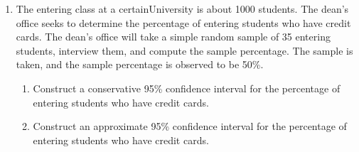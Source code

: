 \documentclass[12pt]{article}%
\newcommand{\0}{{\bf 0}}
\begin{document}
\begin{enumerate}
\item
The entering class at a certainUniversity is about 1000 students. The dean's office seeks to determine the percentage of entering students who have credit cards. The dean's office will take a simple random sample of 35 entering students, interview them, and compute the sample percentage. 
The sample is taken, and the sample percentage is observed to be 50\%.
\begin{enumerate}
\item
Construct a conservative 95\% confidence interval for the percentage of entering students who have credit cards. 
\item
Construct an approximate 95\% confidence interval for the percentage of entering students who have credit cards. 
\end{enumerate}




\end{enumerate}
\end{document}
